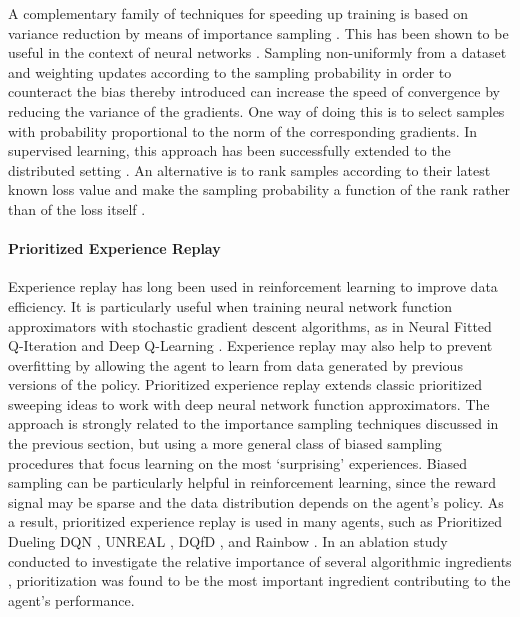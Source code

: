 \documentclass{article} \PassOptionsToPackage{usenames,dvipsnames}{xcolor}
\begin{document}
A complementary family of techniques for speeding up training is based on variance reduction by means of importance sampling \citep[cf.][]{hastings1970monte}. This has been shown to be useful in the context of neural networks \citep{Hinton2007-vs}. Sampling non-uniformly from a dataset and weighting updates according to the sampling probability in order to counteract the bias thereby introduced can increase the speed of convergence by reducing the variance of the gradients. One way of doing this is to select samples with probability proportional to the  norm of the corresponding gradients. In supervised learning, this approach has been successfully extended to the distributed setting \citep{alain2015variance}. An alternative is to rank samples according to their latest known loss value and make the sampling probability a function of the rank rather than of the loss itself \citep{loshchilov2015online}.

\paragraph{Prioritized Experience Replay}

Experience replay \citep{experience-replay} has long been used in reinforcement learning to improve data efficiency. It is particularly useful when training neural network function approximators with stochastic gradient descent algorithms, as in Neural Fitted Q-Iteration \citep{nfq} and Deep Q-Learning \citep{dqn}. Experience replay may also help to prevent overfitting by allowing the agent to learn from data generated by previous versions of the policy. Prioritized experience replay \citep{prioritized-replay} extends classic prioritized sweeping ideas \citep{prioritized-sweeping} to work with deep neural network function approximators. The approach is strongly related to the importance sampling techniques discussed in the previous section, but using a more general class of biased sampling procedures that focus learning on the most `surprising' experiences. Biased sampling can be particularly helpful in reinforcement learning, since the reward signal may be sparse and the data distribution depends on the agent's policy. As a result, prioritized experience replay is used in many agents, such as Prioritized Dueling DQN \citep{dueling}, UNREAL \citep{unreal}, DQfD \citep{dqfd}, and Rainbow \citep{rainbow}. In an ablation study conducted to investigate the relative importance of several algorithmic ingredients \citep{rainbow}, prioritization was found to be the most important ingredient contributing to the agent's performance. 
\end{document}
